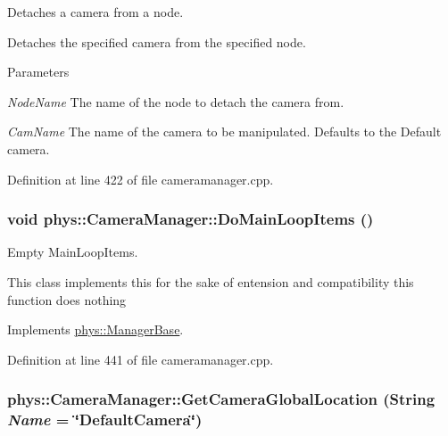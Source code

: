 Detaches a camera from a node. 

Detaches the specified camera from the specified node. 
\begin{DoxyParams}{Parameters}
\item[{\em NodeName}]The name of the node to detach the camera from. \item[{\em CamName}]The name of the camera to be manipulated. Defaults to the Default camera. \end{DoxyParams}


Definition at line 422 of file cameramanager.cpp.

\hypertarget{classphys_1_1CameraManager_aaae22266bccc43f6efa66d2735d7d1d3}{
\subsubsection[{DoMainLoopItems}]{\setlength{\rightskip}{0pt plus 5cm}void phys::CameraManager::DoMainLoopItems ()}}
\label{d9/d91/classphys_1_1CameraManager_aaae22266bccc43f6efa66d2735d7d1d3}


Empty MainLoopItems. 

This class implements this for the sake of entension and compatibility this function does nothing 

Implements \hyperlink{classphys_1_1ManagerBase_aa9e13a3f7c398b708f0f242610b5abf7}{phys::ManagerBase}.



Definition at line 441 of file cameramanager.cpp.

\hypertarget{classphys_1_1CameraManager_a53ef7e8f0a4227a5a35db88fe74772fa}{
\subsubsection[{GetCameraGlobalLocation}]{ phys::CameraManager::GetCameraGlobalLocation ({\bf String} {\em Name} = {\ttfamily \char`\"{}DefaultCamera\char`\"{}})}}
\label{d9/d91/classphys_1_1CameraManager_a53ef7e8f0a4227a5a35db88fe74772fa}


